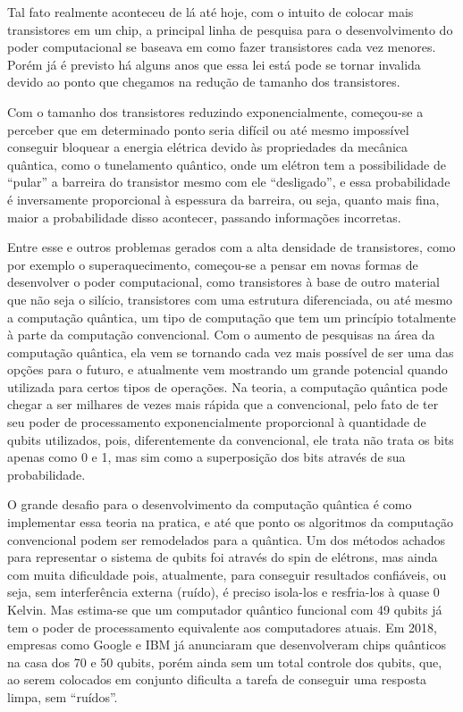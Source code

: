 \documentclass[
	12pt,				%
	oneside,			%
	a4paper,			%
	english,			%
	french,				%
	spanish,			%
	brazil,				%
	]{abntex2}
\begin{document}
Tal fato realmente aconteceu de lá até hoje, com o intuito de colocar mais transistores em um chip, a principal linha de pesquisa para o desenvolvimento do poder computacional se baseava em como fazer transistores cada vez menores. Porém já é previsto há alguns anos que essa lei está pode se tornar invalida devido ao ponto que chegamos na redução de tamanho dos transistores. 

Com o tamanho dos transistores reduzindo exponencialmente, começou-se a perceber que em determinado ponto seria difícil ou até mesmo impossível conseguir bloquear a energia elétrica devido às propriedades da mecânica quântica, como o tunelamento quântico, onde um elétron tem a possibilidade de “pular” a barreira do transistor mesmo com ele “desligado”, e essa probabilidade é inversamente proporcional à espessura da barreira, ou seja, quanto mais fina, maior a probabilidade disso acontecer, passando informações incorretas. 

Entre esse e outros problemas gerados com a alta densidade de transistores, como por exemplo o superaquecimento, começou-se a pensar em novas formas de desenvolver o poder computacional, como transistores à base de outro material que não seja o silício, transistores com uma estrutura diferenciada, ou até mesmo a computação quântica, um tipo de computação que tem um princípio totalmente à parte da computação convencional.
Com o aumento de pesquisas na área da computação quântica, ela vem se tornando cada vez mais possível de ser uma das opções para o futuro, e atualmente vem mostrando um grande potencial quando utilizada para certos tipos de operações.
Na teoria, a computação quântica pode chegar a ser milhares de vezes mais rápida que a convencional, pelo fato de ter seu poder de processamento exponencialmente proporcional à quantidade de qubits utilizados, pois, diferentemente da convencional, ele trata não trata os bits apenas como 0 e 1, mas sim como a superposição dos bits através de sua probabilidade. 

O grande desafio para o desenvolvimento da computação quântica é como implementar essa teoria na pratica, e até que ponto os algoritmos da computação convencional podem ser remodelados para a quântica. Um dos métodos achados para representar o sistema de qubits foi através do spin de elétrons, mas ainda com muita dificuldade pois, atualmente, para conseguir resultados confiáveis, ou seja, sem interferência externa (ruído), é preciso isola-los e resfria-los à quase 0 Kelvin. Mas estima-se que um computador quântico funcional com 49 qubits já tem o poder de processamento equivalente aos computadores atuais. Em 2018, empresas como Google e IBM já anunciaram que desenvolveram chips quânticos na casa dos 70 e 50 qubits, porém ainda sem um total controle dos qubits, que, ao serem colocados em conjunto dificulta a tarefa de conseguir uma resposta limpa, sem “ruídos”. 
\end{document}
